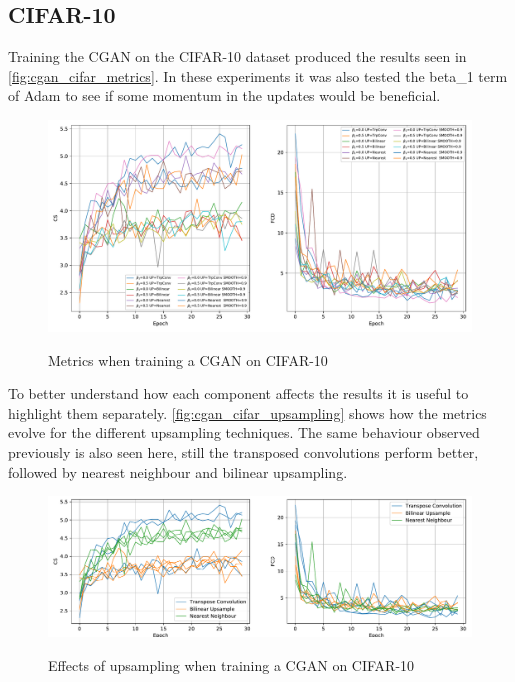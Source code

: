 \subsection{CIFAR-10}
Training the \gls{CGAN} on the \gls{CIFAR}-10 dataset produced the results seen in \autoref{fig:cgan_cifar_metrics}. In these experiments it was also tested the \gls{beta_1} term of Adam to see if some momentum in the updates would be beneficial.
\begin{figure}[hbt]
    \centering
    \caption{Metrics when training a CGAN on CIFAR-10}
    \includegraphics[width=\textwidth]{chapters/Experiments/CGAN/cifar_metrics.pdf}
    \label{fig:cgan_cifar_metrics}
\end{figure}

To better understand how each component affects the results it is useful to highlight them separately. \autoref{fig:cgan_cifar_upsampling} shows how the metrics evolve for the different upsampling techniques. The same behaviour observed previously is also seen here, still the transposed convolutions perform better, followed by nearest neighbour and bilinear upsampling.
\begin{figure}[hbt]
    \centering
    \caption{Effects of upsampling when training a CGAN on CIFAR-10}
    \includegraphics[width=\textwidth]{chapters/Experiments/CGAN/cifar_upsampling.pdf}
    \label{fig:cgan_cifar_upsampling}
\end{figure}

